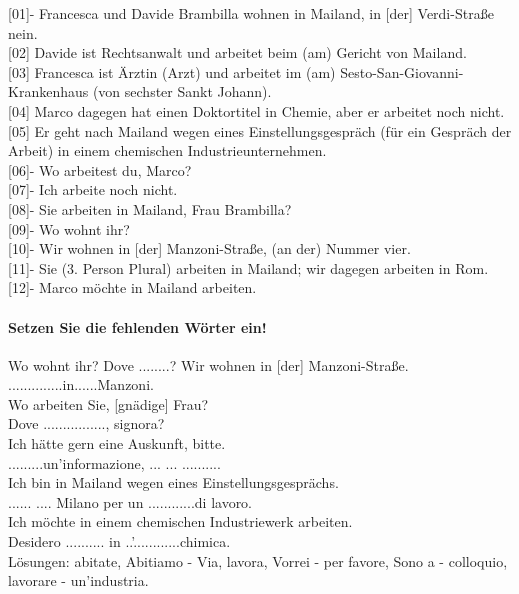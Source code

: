\documentclass{article}
\begin{document}
[01]- Francesca und Davide Brambilla wohnen in Mailand, in [der] Verdi-Straße
nein.\\
{[02]} Davide ist Rechtsanwalt und arbeitet beim (am) Gericht von Mailand.\\
{[03]} Francesca ist Ärztin (Arzt) und arbeitet im (am) Sesto-San-Giovanni-
Krankenhaus (von sechster Sankt Johann).\\
{[04]} Marco dagegen hat einen Doktortitel in Chemie, aber er arbeitet noch
nicht.\\
{[05]} Er geht nach Mailand wegen eines Einstellungsgespräch (für ein Gespräch
der Arbeit) in einem chemischen Industrieunternehmen.\\
{[06]}- Wo arbeitest du, Marco?\\
{[07]}- Ich arbeite noch nicht.\\
{[08]}- Sie arbeiten in Mailand, Frau Brambilla?\\
{[09]}- Wo wohnt ihr?\\
{[10]}- Wir wohnen in [der] Manzoni-Straße, (an der) Nummer vier.\\
{[11]}- Sie (3. Person Plural) arbeiten in Mailand; wir dagegen arbeiten in
Rom.\\
{[12]}- Marco möchte in Mailand arbeiten.\\

\paragraph{Setzen Sie die fehlenden Wörter ein!}

Wo wohnt ihr? Dove ........?
    Wir wohnen in [der] Manzoni-Straße.\\
    ..............in......Manzoni.\\
    Wo arbeiten Sie, [gnädige] Frau?\\
    Dove ................, signora?\\
    Ich hätte gern eine Auskunft, bitte.\\
    .........un'informazione, ... ... ..........\\
    Ich bin in Mailand wegen eines Einstellungsgesprächs.\\
    ...... .... Milano per un ............di lavoro.\\
    Ich möchte in einem chemischen Industriewerk arbeiten.\\
    Desidero .......... in ..'............chimica.\\

    Lösungen: abitate, Abitiamo - Via, lavora, Vorrei - per favore, Sono a -
    colloquio, lavorare - un'industria.
\end{document}
